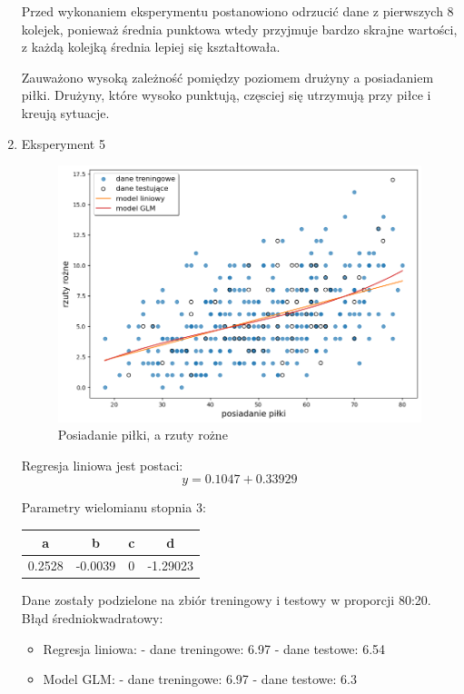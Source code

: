 \documentclass[11pt]{article}
\begin{document}
\begin{enumerate}[label=\alph*)]
    
    Przed wykonaniem eksperymentu postanowiono odrzucić dane z pierwszych 8 kolejek, ponieważ średnia punktowa wtedy przyjmuje bardzo skrajne wartości, z każdą kolejką średnia lepiej się kształtowała.
    
    Zauważono wysoką zależność pomiędzy poziomem drużyny a posiadaniem piłki. Drużyny, które wysoko punktują, częsciej się utrzymują przy piłce i kreują sytuacje.
    
    \item Eksperyment 5 \newline

    \begin{figure}[hbt]
    \includegraphics[scale=0.30]{corners.png}
    \caption{Posiadanie piłki, a rzuty rożne}
    \end{figure}

    Regresja liniowa jest postaci:
    \begin{equation}
    y = 0.1047 + 0.33929
    \end{equation}
    
    Parametry wielomianu stopnia 3:
    \begin{center}
    \begin{tabular}{| c | c | c | c |}
    \hline
    a & b & c & d \\ \hline
    0.2528 & -0.0039 & 0 & -1.29023 \\ \hline
    \end{tabular}
    \end{center}

    Dane zostały podzielone na zbiór treningowy i testowy w proporcji 80:20.
    \newline
    \newline
    Błąd średniokwadratowy:
    \begin{itemize}
    \item Regresja liniowa: \newline
    - dane treningowe: 6.97 \newline
    - dane testowe: 6.54
    \item Model GLM: \newline
    - dane treningowe: 6.97 \newline
    - dane testowe: 6.3
    \end{itemize}


\end{enumerate}
\end{document}
